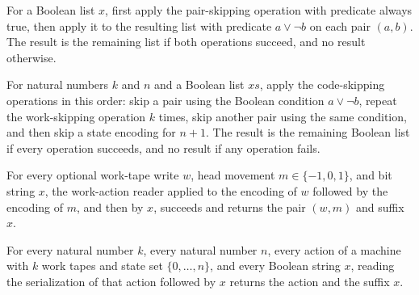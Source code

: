 \begin{definition}
\label{Turing.codeSkipWork}
\leanok
{}
For a Boolean list $x$, first apply the pair-skipping operation with predicate always
true, then apply it to the resulting list with predicate $a\lor\neg b$ on each pair
$(a,b)$. The result is the remaining list if both operations succeed, and no result
otherwise.
\end{definition}

\begin{definition}
\label{Turing.codeSkipActionK}
\leanok
{}
For natural numbers $k$ and $n$ and a Boolean list $xs$, apply the code-skipping
operations in this order: skip a pair using the Boolean condition $a \lor \neg b$,
repeat the work-skipping operation $k$ times, skip another pair using the same
condition, and then skip a state encoding for $n+1$. The result is the remaining Boolean
list if every operation succeeds, and no result if any operation fails.
\end{definition}

\begin{lemma}
\label{Turing.codeReadWork_append}
\leanok
{}
For every optional work-tape write $w$, head movement $m\in\{-1,0,1\}$, and bit string
$x$, the work-action reader applied to the encoding of $w$ followed by the encoding of
$m$, and then by $x$, succeeds and returns the pair $(w,m)$ and suffix $x$.
\end{lemma}

\begin{lemma}
\label{Turing.codeReadActionK_append}
\leanok
{}
For every natural number $k$, every natural number $n$, every action of a machine with
$k$ work tapes and state set $\{0,\ldots,n\}$, and every Boolean string $x$, reading the
serialization of that action followed by $x$ returns the action and the suffix $x$.
\end{lemma}

